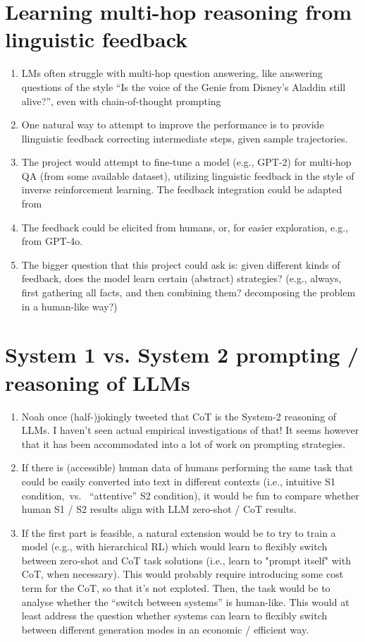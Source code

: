 \documentclass[fleqn,reqno,10pt]{article}
\begin{document}
\section{Learning multi-hop reasoning from linguistic feedback}
\begin{enumerate}
	\item LMs often struggle with multi-hop question answering, like answering questions of the style ``Is the voice of the Genie from Disney’s Aladdin still alive?'', even with chain-of-thought prompting
	\item One natural way to attempt to improve the performance is to provide llinguistic feedback correcting intermediate steps, given sample trajectories.
	\item The project would attempt to fine-tune a model (e.g., GPT-2) for multi-hop QA (from some available dataset), utilizing linguistic feedback in the style of inverse reinforcement learning. The feedback integration could be adapted from \citep{sumers2021learning}
	\item The feedback could be elicited from humans, or, for easier exploration, e.g., from GPT-4o.
	\item The bigger question that this project could ask is: given different kinds of feedback, does the model learn certain (abstract) strategies? (e.g., always, first gathering all facts, and then combining them? decomposing the problem in a human-like way?)
\end{enumerate}

\section{System 1 vs. System 2 prompting / reasoning of LLMs}
\begin{enumerate}
	\item Noah once (half-)jokingly tweeted that CoT is the System-2 reasoning of LLMs. I haven't seen actual empirical investigations of that! It seems however that it has been accommodated into a lot of work on prompting strategies.
	\item If there is (accessible) human data of humans performing the same task that could be easily converted into text in different contexts (i.e., intuitive S1 condition,~vs.~ ``attentive'' S2 condition), it would be fun to compare whether human S1 / S2 results align with LLM zero-shot / CoT results.
	\item If the first part is feasible, a natural extension would be to try to train a model (e.g., with hierarchical RL) which would learn to flexibly switch between zero-shot and CoT task solutions (i.e., learn to "prompt itself" with CoT, when necessary). This would probably require introducing some cost term for the CoT, so that it's not exploted. Then, the task would be to analyse whether the ``switch between systems'' is human-like.  This would at least address the question whether systems can learn to flexibly switch between different generation modes in an economic / efficient way.
\end{enumerate}
\end{document}
